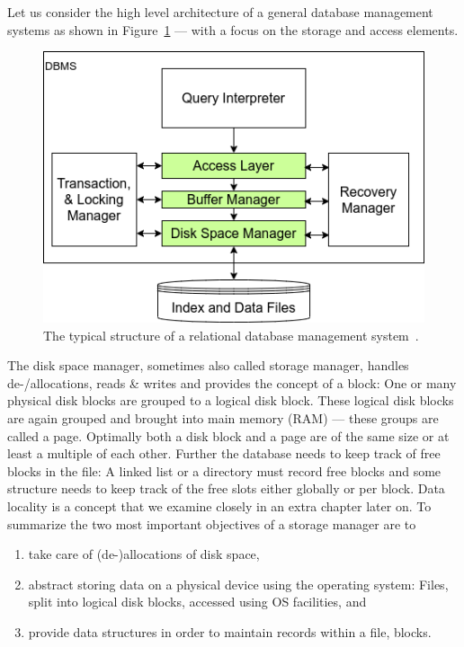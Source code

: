     Let us consider the high level architecture of a general database management systems as shown in Figure~\ref{dbms_arch} --- with a focus on the storage and access elements.

    \begin{figure}[htp]
    \begin{center}
    \includegraphics[keepaspectratio,width=.5\textwidth]{img/04-databases/RDBMS.png}
    \end{center}
    \caption{The typical structure of a relational database management system~\autocite{ramakrishnan2000database}.}
    \label{dbms_arch}
    \end{figure}

    The disk space manager, sometimes also called storage manager, handles de-/allocations, reads \& writes and provides the concept of a block: One or many physical disk blocks are grouped to a logical disk block.
    These logical disk blocks are again grouped and brought into main memory (RAM) --- these groups are called a page.
    Optimally both a disk block and a page are of the same size or at least a multiple of each other. 
    Further the database needs to keep track of free blocks in the file: 
    A linked list or a directory must record free blocks and some structure needs to keep track of the free slots either globally or per block. 
    Data locality is a concept that we examine closely in an extra chapter later on.
    To summarize the two most important objectives of a storage manager are to
    \begin{enumerate} 
     \item take care of (de-)allocations of disk space,
     \item abstract storing data on a physical device using the operating system: Files, split into logical disk blocks, accessed using OS facilities, and
     \item provide data structures in order to maintain records within a file, blocks.
    \end{enumerate}
    

